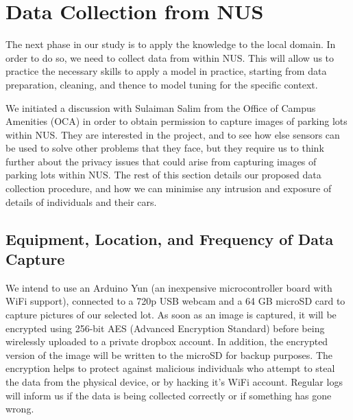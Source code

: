 \documentclass[]{article}
\begin{document}
\section{Data Collection from NUS}
\label{data-collection-nus}

The next phase in our study is to apply the knowledge to the local domain. In
order to do so, we need to collect data from within NUS. This will allow us to
practice the necessary skills to apply a model in practice, starting from data
preparation, cleaning, and thence to model tuning for the specific context.

We initiated a discussion with Sulaiman Salim from the Office of Campus
Amenities (OCA) in order to obtain permission to capture images of parking lots
within NUS. They are interested in the project, and to see how else sensors can
be used to solve other problems that they face, but they
require us to think further about the privacy issues that could arise from
capturing images of parking lots within NUS. The rest of this section details
our proposed data collection procedure, and how we can minimise any intrusion
and exposure of details of individuals and their cars.

\subsection{Equipment, Location, and Frequency of Data Capture}

We intend to use an Arduino Yun (an inexpensive microcontroller board with WiFi
support), connected to a 720p USB webcam and a 64 GB microSD card to capture
pictures of our selected lot. As soon as an image is captured, it will be
encrypted using 256-bit AES (Advanced Encryption Standard) before being
wirelessly uploaded to a private dropbox account.  In addition, the encrypted
version of the image will be written to the microSD for backup purposes. The
encryption helps to protect against malicious individuals who attempt to steal
the data from the physical device, or by hacking it's WiFi account. Regular
logs will inform us if the data is being collected correctly or if something has
gone wrong.
\end{document}
